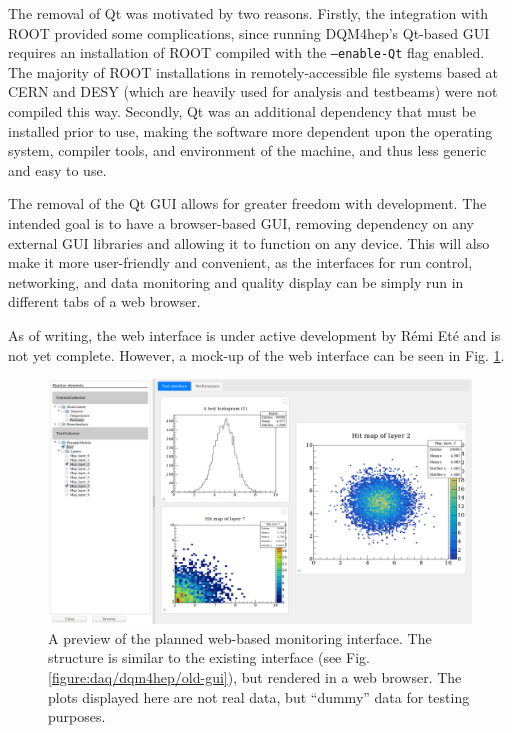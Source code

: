The removal of Qt was motivated by two reasons. Firstly, the integration with ROOT provided some complications, since running \acrshort{DQM4hep}'s Qt-based \acrshort{GUI} requires an installation of ROOT compiled with the \texttt{--enable-Qt} flag enabled. The majority of ROOT installations in remotely-accessible file systems based at \acrshort{CERN} and \acrshort{DESY} (which are heavily used for analysis and testbeams) were not compiled this way. Secondly, Qt was an additional dependency that must be installed prior to use, making the software more dependent upon the operating system, compiler tools, and environment of the machine, and thus less generic and easy to use. %

The removal of the Qt \acrshort{GUI} allows for greater freedom with development. The intended goal is to have a browser-based GUI, removing dependency on any external \acrshort{GUI} libraries and allowing it to function on any device. This will also make it more user-friendly and convenient, as the interfaces for run control, networking, and data monitoring and quality display can be simply run in different tabs of a web browser.

As of writing, the web interface is under active development by R\'{e}mi Et\'{e} and is not yet complete. However, a mock-up of the web interface can be seen in Fig. \ref{figure:daq/dqm4hep/future-gui}.

\begin{figure}[h]
	\centering
	\includegraphics[width=1.0\textwidth]{../Pictures/ScreenshotWebMonitoring.png}
	\caption{A preview of the planned web-based monitoring interface. The structure is similar to the existing interface (see Fig. \ref{figure:daq/dqm4hep/old-gui}), but rendered in a web browser. The plots displayed here are not real data, but ``dummy'' data for testing purposes.}
	\label{figure:daq/dqm4hep/future-gui}
\end{figure}

